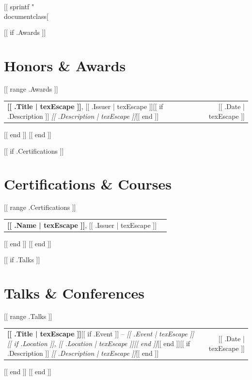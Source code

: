 [[ sprintf "\\documentclass[%
\makeatletter
\newcommand{\cvrow}[2]{%
  \noindent
  \begin{tabular*}{\linewidth}{@{}l@{\extracolsep{\fill}}r@{}}
    \small #1 & \small #2 \\
  \end{tabular*}\vspace{-2pt}%
}
\makeatother
\begin{document}
[[ if .Awards ]]
\section{Honors \& Awards}
\vspace{2pt}
[[ range .Awards ]]
\cvrow{\textbf{[[ .Title | texEscape ]]}, [[ .Issuer | texEscape ]][[ if .Description ]] \newline\small\textit{[[ .Description | texEscape ]]}[[ end ]]}{[[ .Date | texEscape ]]}
\vspace{2pt}
[[ end ]]
[[ end ]]

[[ if .Certifications ]]
\section{Certifications \& Courses}
\vspace{2pt}
[[ range .Certifications ]]
\cvrow{\textbf{[[ .Name | texEscape ]]}, [[ .Issuer | texEscape ]]}{}
\vspace{2pt}
[[ end ]]
[[ end ]]

[[ if .Talks ]]
\section{Talks \& Conferences}
\vspace{2pt}
[[ range .Talks ]]
\cvrow{\textbf{[[ .Title | texEscape ]]}[[ if .Event ]] -- \textit{[[ .Event | texEscape ]][[ if .Location ]], [[ .Location | texEscape ]][[ end ]]}[[ end ]][[ if .Description ]] \newline\small\textit{[[ .Description | texEscape ]]}[[ end ]]}{[[ .Date | texEscape ]]}
\vspace{2pt}
[[ end ]]
[[ end ]]
\end{document}
